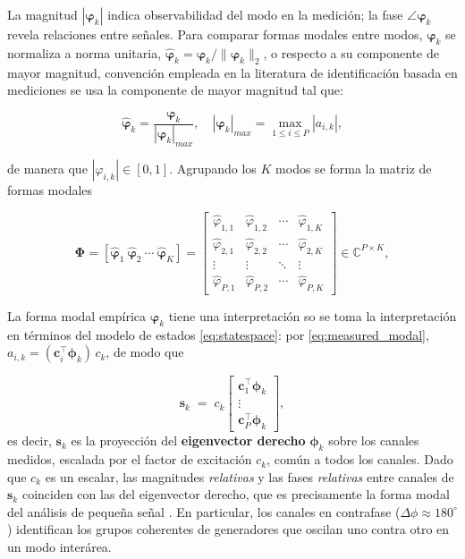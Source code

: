La magnitud $|\mathbf{\varphi}_k|$ indica observabilidad del modo en la medición; la fase $\angle\mathbf{\varphi}_k$ 
revela relaciones entre señales. Para comparar formas
modales entre modos, $\mathbf{\varphi}_k$ se normaliza a norma unitaria, 
$\hat{\mathbf{\varphi}}_k = \mathbf{\varphi}_k / \lVert\mathbf{\varphi}_k\rVert_2$,
o respecto a su componente de mayor magnitud, convención empleada en la literatura de identificación 
basada en mediciones \cite{jiang2021,li2020era} se usa la componente de mayor magnitud tal que:

\begin{equation}
\hat{\boldsymbol{\varphi}}_k = \frac{\boldsymbol{\varphi}_k}{|\boldsymbol{\varphi}_k|_{max}}, \quad
|\boldsymbol{\varphi}_k|_{max} = \max_{1 \leq i \leq P} |a_{i,k}|,
\label{eq:normalizacion}
\end{equation}

de manera que $|\hat{\varphi}_{i,k}| \in [0,1]$. Agrupando los $K$ modos se forma la matriz de formas modales

\begin{equation}
\boldsymbol{\Phi} = [\hat{\boldsymbol{\varphi}}_1\ \hat{\boldsymbol{\varphi}}_2\ \cdots\ \hat{\boldsymbol{\varphi}}_K] =
\begin{bmatrix}
\hat{\varphi}_{1,1} & \hat{\varphi}_{1,2} & \cdots & \hat{\varphi}_{1,K} \\
\hat{\varphi}_{2,1} & \hat{\varphi}_{2,2} & \cdots & \hat{\varphi}_{2,K} \\
\vdots & \vdots & \ddots & \vdots \\
\hat{\varphi}_{P,1} & \hat{\varphi}_{P,2} & \cdots & \hat{\varphi}_{P,K}
\end{bmatrix} \in \mathbb{C}^{P \times K},
\label{eq:matriz_formas_modales}
\end{equation}

La forma modal empírica $\mathbf{\varphi}_k$ tiene una interpretación so se toma la interpretación en
términos del modelo de estados \eqref{eq:statespace}: por
\eqref{eq:measured_modal}, $a_{i,k} =
(\mathbf{c}_i^\top\boldsymbol{\phi}_k)\,c_k$, de modo que

\begin{equation}
    \mathbf{s}_k \;=\; c_k
    \begin{bmatrix}
        \mathbf{c}_1^\top \boldsymbol{\phi}_k \\
        \vdots \\
        \mathbf{c}_P^\top \boldsymbol{\phi}_k
    \end{bmatrix},
    \label{eq:shape_link}
\end{equation}
es decir, $\mathbf{s}_k$ es la proyección del \textbf{eigenvector derecho}
$\boldsymbol{\phi}_k$ sobre los canales medidos, escalada por el factor de
excitación $c_k$, común a todos los canales. Dado que $c_k$ es un escalar,
las magnitudes \textit{relativas} y las fases \textit{relativas} entre
canales de $\mathbf{s}_k$ coinciden con las del eigenvector derecho, que es
precisamente la forma modal del análisis de pequeña señal
\cite{kundur1994}. En particular, los canales en contrafase
($\Delta\phi \approx 180^\circ$) identifican los grupos coherentes de
generadores que oscilan uno contra otro en un modo interárea.

